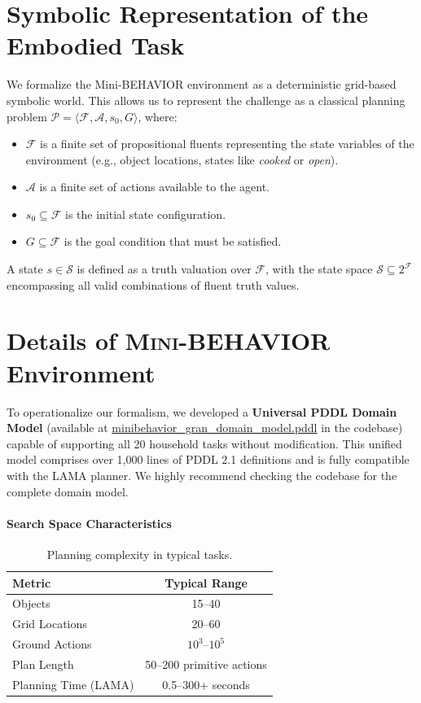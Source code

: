 \section{Symbolic Representation of the Embodied Task}
\label{app_sec:classical_prob_def}


We formalize the Mini-BEHAVIOR environment as a deterministic grid-based symbolic world. This allows us to represent the challenge as a classical planning problem $\mathcal{P} = \langle \mathcal{F}, \mathcal{A}, s_0, G \rangle$, where:
\begin{itemize}[leftmargin=*]
    \item $\mathcal{F}$ is a finite set of propositional fluents representing the state variables of the environment (e.g., object locations, states like \textit{cooked} or \textit{open}).
    \item $\mathcal{A}$ is a finite set of actions available to the agent.
    \item $s_0 \subseteq \mathcal{F}$ is the initial state configuration.
    \item $G \subseteq \mathcal{F}$ is the goal condition that must be satisfied.
\end{itemize}
A state $s \in \mathcal{S}$ is defined as a truth valuation over $\mathcal{F}$, with the state space $\mathcal{S} \subseteq 2^\mathcal{F}$ encompassing all valid combinations of fluent truth values.

\section{Details of \textsc{Mini-BEHAVIOR} Environment}
\label{app_sec:minibehavior_details}

To operationalize our formalism, we developed a \textbf{Universal PDDL Domain Model} (available at \url{minibehavior_gran_domain_model.pddl} in the codebase) capable of supporting all 20 household tasks without modification. This unified model comprises over 1,000 lines of PDDL 2.1 definitions and is fully compatible with the LAMA planner. We highly recommend checking the codebase for the complete domain model.

\paragraph{Search Space Characteristics}
\begin{table}[H]
    \centering
    \small
    \caption{Planning complexity in typical tasks.}
    \label{tab:planning_complexity}
    \begin{tabular}{@{}lc@{}}
        \toprule
        \textbf{Metric} & \textbf{Typical Range} \\
        \midrule
        Objects & 15--40 \\
        Grid Locations & 20--60 \\
        Ground Actions & $10^3$--$10^5$ \\
        Plan Length & 50--200 primitive actions \\
        Planning Time (LAMA) & 0.5--300+ seconds \\
        \bottomrule
    \end{tabular}
\end{table}

